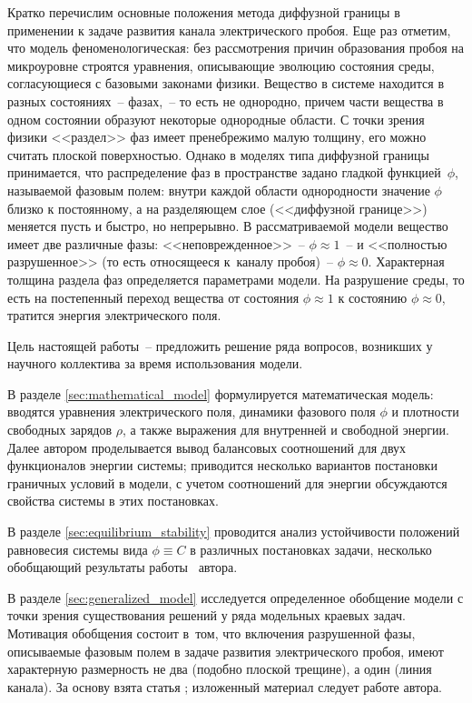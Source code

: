 Кратко перечислим основные положения метода диффузной границы в применении к задаче развития канала электрического пробоя. Еще раз отметим, что модель феноменологическая: без рассмотрения причин образования пробоя на микроуровне строятся уравнения, описывающие эволюцию состояния среды, согласующиеся с базовыми законами физики. Вещество в системе находится в разных состояниях~-- фазах,~-- то есть не однородно, причем части вещества в одном состоянии образуют некоторые однородные области. С точки зрения физики <<раздел>> фаз имеет пренебрежимо малую толщину, его можно считать плоской поверхностью. Однако в моделях типа диффузной границы принимается, что распределение фаз в пространстве задано гладкой функцией~$\phi$, называемой фазовым полем: внутри каждой области однородности значение $\phi$ близко к постоянному, а на разделяющем слое (<<диффузной границе>>) меняется пусть и быстро, но непрерывно. В рассматриваемой модели вещество имеет две различные фазы: <<неповрежденное>>~-- $\phi \approx 1$~-- и <<полностью разрушенное>> (то есть относящееся к~каналу пробоя)~-- $\phi \approx 0$. Характерная толщина раздела фаз определяется параметрами модели. На разрушение среды, то есть на постепенный переход вещества от состояния $\phi \approx 1$ к состоянию $\phi \approx 0$, тратится энергия электрического поля.

Цель настоящей работы~-- предложить решение ряда вопросов, возникших у научного коллектива за время использования модели.

В разделе \ref{sec:mathematical_model} формулируется математическая модель: вводятся уравнения электрического поля, динамики фазового поля $\phi$ и плотности свободных зарядов $\rho$, а также выражения для внутренней и свободной энергии. Далее автором проделывается вывод балансовых соотношений для двух функционалов энергии системы; приводится несколько вариантов постановки граничных условий в модели, с учетом соотношений для энергии обсуждаются свойства системы в этих постановках.

В разделе \ref{sec:equilibrium_stability} проводится анализ устойчивости положений равновесия системы вида $\phi \equiv C$ в различных постановках задачи, несколько обобщающий результаты работы~\cite{ponomarev_stability} автора.

В разделе \ref{sec:generalized_model} исследуется определенное обобщение модели с точки зрения существования решений у ряда модельных краевых задач. Мотивация обобщения состоит в~том, что включения разрушенной фазы, описываемые фазовым полем в задаче развития электрического пробоя, имеют характерную размерность не два (подобно плоской трещине), а один (линия канала). За основу взята статья \cite{zipunova_higher_codimension}; изложенный материал следует работе \cite{ponomarev_generalization} автора.

